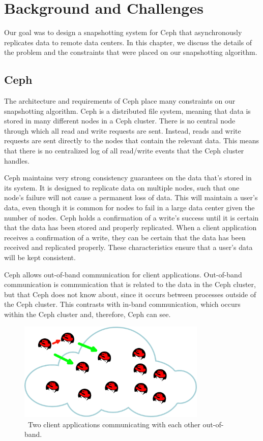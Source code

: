 \chapter{Background and Challenges}
\label{sec:description}

Our goal was to design a snapshotting system for Ceph that
asynchronously replicates data to remote data centers. In this
chapter, we discuss the details of the problem and the constraints
that were placed on our snapshotting algorithm.

\section{Ceph}

The architecture and requirements of Ceph place many constraints on
our snapshotting algorithm. Ceph is a distributed file system, meaning that data is
stored in many different nodes in a Ceph cluster. There is no central
node through which all read and write requests are sent.  Instead,
reads and write requests are sent directly to the nodes that contain
the relevant data. This means that there is no centralized log of all
read/write events that the Ceph cluster handles.

Ceph maintains very strong consistency guarantees on the data that's
stored in its system. It is designed to replicate data on multiple
nodes, such that one node's failure will not cause a permanent loss of
data. This will maintain a user's data, even though it is common for
nodes to fail in a large data center given the number of
nodes. Ceph holds a confirmation of a write's success until
it is certain that the data has been stored and properly
replicated. When a client application receives a confirmation of a write, they can
be certain that the data has been received and replicated
properly. These characteristics ensure that a user's data will be kept
consistent.

Ceph allows out-of-band communication for client applications.
Out-of-band communication is communication that is related to the data
in the Ceph cluster, but that Ceph does not know about, since it occurs between processes outside of the Ceph cluster. This contrasts with
in-band communication, which occurs within the Ceph cluster and, therefore, Ceph can see.

\begin{figure}[!htbp]
  \centering
  \caption{~Two client applications communicating with each other out-of-band.} 
  \label{fig:out-of-band}
  \includegraphics[width=0.8\textwidth]{outofbandwrite.png}
\end{figure}

